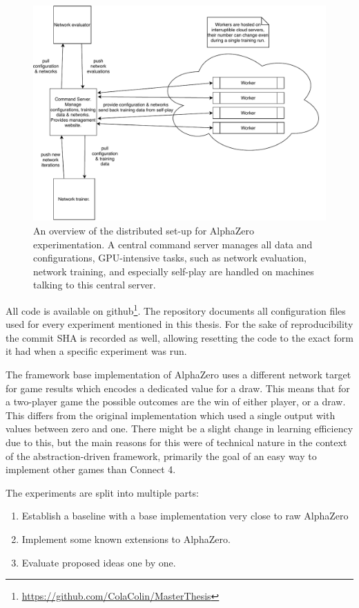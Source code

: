 \documentclass[12pt,onecolumn,oneside,titlepage]{article}
\begin{document}
\begin{figure}[H]
\centering
\includegraphics[clip,width=\columnwidth]{x0_framework_overview}
\caption{An overview of the distributed set-up for AlphaZero experimentation. 
A central command server manages all data and configurations, GPU-intensive tasks, such as network evaluation, network training, and especially self-play are handled on machines talking to this central server.}
\label{fig:x0_framework_overview}
\end{figure}

All code is available on github\footnote{\url{https://github.com/ColaColin/MasterThesis}}. The repository documents all configuration files used for every experiment mentioned in this thesis.
For the sake of reproducibility the commit SHA is recorded as well, allowing resetting the code to the exact form it had when a specific experiment was run.

The framework base implementation of AlphaZero uses a different network target for game results
which encodes a dedicated value for a draw. This means that for a two-player game the possible outcomes are the win of either player, or a draw.
This differs from the original implementation which used a single output with values between zero and one.
There might be a slight change in learning efficiency due to this, but the main reasons for this were of technical nature in the context 
of the abstraction-driven framework, primarily the goal of an easy way to implement other games than Connect 4.

The experiments are split into multiple parts:
\begin{enumerate}
 \item Establish a baseline with a base implementation very close to raw AlphaZero
 \item Implement some known extensions to AlphaZero.
 \item Evaluate proposed ideas one by one.
\end{enumerate}
\end{document}
